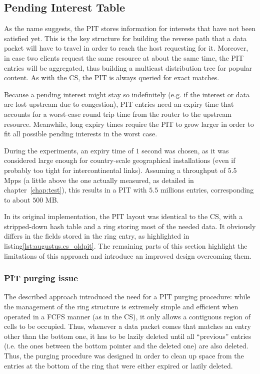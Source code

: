 \documentclass[11pt,a4paper,twoside,titlepage,openany]{book}
\begin{document}
\subsection{Pending Interest Table}\label{sec:augustus.pit}
As the name suggests, the \gls{PIT} stores information for interests that have not been satisfied yet. This is the key structure for building the reverse path that a data packet will have to travel in order to reach the host requesting for it. Moreover, in case two clients request the same resource at about the same time, the PIT entries will be aggregated, thus building a multicast distribution tree for popular content.
As with the \gls{CS}, the PIT is always queried for exact matches.

Because a pending interest might stay so indefinitely (e.g. if the interest or data are lost upstream due to congestion), PIT entries need an expiry time that accounts for a worst-case round trip time from the router to the upstream resource. Meanwhile, long expiry times require the PIT to grow larger in order to fit all possible pending interests in the worst case.

During the experiments, an expiry time of $1$ second was chosen, as it was considered large enough for country-scale geographical installations (even if probably too tight for intercontinental links). Assuming a throughput of $5.5$ \gls{Mpps} (a little above the one actually measured, as detailed in chapter~\ref{chap:test}), this results in a PIT with $5.5$ millions entries, corresponding to about $500$ MB.

In its original implementation, the PIT layout was identical to the CS, with a stripped-down hash table and a ring storing most of the needed data. It obviously differs in the fields stored in the ring entry, as highlighted in listing\ref{lst:augustus.cs_oldpit}. The remaining parts of this section highlight the limitations of this approach and introduce an improved design overcoming them.

\subsubsection{PIT purging issue}\label{sec:augustus.pit.purge}
The described approach introduced the need for a PIT purging procedure: while the management of the ring structure is extremely simple and efficient when operated in a FCFS manner (as in the CS), it only allows a contiguous region of cells to be occupied. Thus, whenever a data packet comes that matches an entry other than  the bottom one, it has to be lazily deleted until all ``previous'' entries (i.e. the ones between the bottom pointer and the deleted one) are also deleted.  
Thus, the purging procedure was designed in order to clean up space from the entries at the bottom of the ring that were either expired or lazily deleted.
\end{document}
